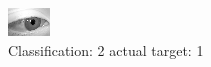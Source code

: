 \begin{figure}[h!]
\begin{center}
\includegraphics[width=0.60\columnwidth]{figures/ID2744_class_2_target_1.png}
\end{center}
\caption{ Classification: 2 actual target: 1}
\label{fig:ID2744_class_2_target_1}
\end{figure}
